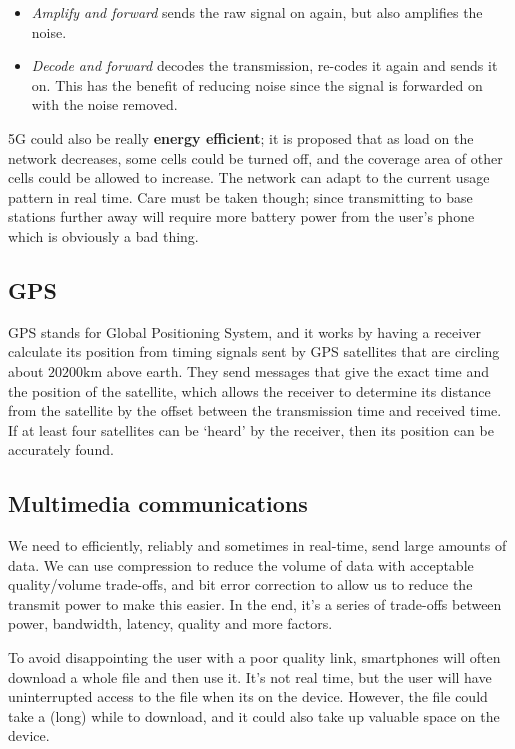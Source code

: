 \begin{itemize}
  \item \textit{Amplify and forward} sends the raw signal on again, but also
  amplifies the noise.
  \item \textit{Decode and forward} decodes the transmission, re-codes it again
  and sends it on. This has the benefit of reducing noise since the signal
  is forwarded on with the noise removed.
\end{itemize}

5G could also be really \textbf{energy efficient}; it is proposed that as load
on the network decreases, some cells could be turned off, and the coverage area
of other cells could be allowed to increase. The network can adapt to the
current usage pattern in real time. Care must be taken though; since
transmitting to base stations further away will require more battery power from
the user's phone which is obviously a bad thing.

\subsection{GPS}

GPS stands for Global Positioning System, and it works by having a receiver
calculate its position from timing signals sent by GPS satellites that are
circling about $20200\si{\kilo\meter}$ above earth. They send messages that give
the exact time and the position of the satellite, which allows the receiver to
determine its distance from the satellite by the offset between the transmission
time and received time. If at least four satellites can be `heard' by the
receiver, then its position can be accurately found.

\subsection{Multimedia communications}

We need to efficiently, reliably and sometimes in real-time, send large amounts
of data. We can use compression to reduce the volume of data with acceptable
quality/volume trade-offs, and bit error correction to allow us to reduce the
transmit power to make this easier. In the end, it's a series of trade-offs
between power, bandwidth, latency, quality and more factors.

To avoid disappointing the user with a poor quality link, smartphones will often
download a whole file and then use it. It's not real time, but the user will
have uninterrupted access to the file when its on the device. However, the file
could take a (long) while to download, and it could also take up valuable space
on the device.

